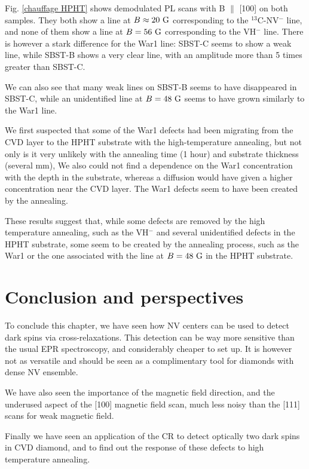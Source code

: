 \documentclass[a4paper,11pt]{report}
\begin{document}
\begin{refsection}
Fig. \ref{chauffage HPHT} shows demodulated PL scans with B $\parallel$ [100] on both samples. They both show a line at $B \approx 20\ \rm G$ corresponding to the $^{13}$C-NV$^-$ line, and none of them show a line at $B = 56\ \rm G$ corresponding to the VH$^-$ line. There is however a stark difference for the War1 line: SBST-C seems to show a weak line, while SBST-B shows a very clear line, with an amplitude more than 5 times greater than SBST-C. 

We can also see that many weak lines on SBST-B seems to have disappeared in SBST-C, while an unidentified line at $B = 48\ \rm G$ seems to have grown similarly to the War1 line.

We first suspected that some of the War1 defects had been migrating from the CVD layer to the HPHT substrate with the high-temperature annealing, but not only is it very unlikely with the annealing time (1 hour) and substrate thickness (several mm), We also could not find a dependence on the War1 concentration with the depth in the substrate, whereas a diffusion would have given a higher concentration near the CVD layer. The War1 defects seem to have been created by the annealing.

These results suggest that, while some defects are removed by the high temperature annealing, such as the VH$^-$ and several unidentified defects in the HPHT substrate, some seem to be created by the annealing process, such as the War1 or the one associated with the line at $B = 48\ \rm G$ in the HPHT substrate.

\section{Conclusion and perspectives}

To conclude this chapter, we have seen how NV centers can be used to detect dark spins via cross-relaxations. This detection can be way more sensitive than the usual EPR spectroscopy, and considerably cheaper to set up. It is however not as versatile and should be seen as a complimentary tool for diamonds with dense NV ensemble. 

We have also seen the importance of the magnetic field direction, and the underused aspect of the [100] magnetic field scan, much less noisy than the [111] scans for weak magnetic field.

Finally we have seen an application of the CR to detect optically two dark spins in CVD diamond, and to find out the response of these defects to high temperature annealing.


\end{refsection}
\end{document}

